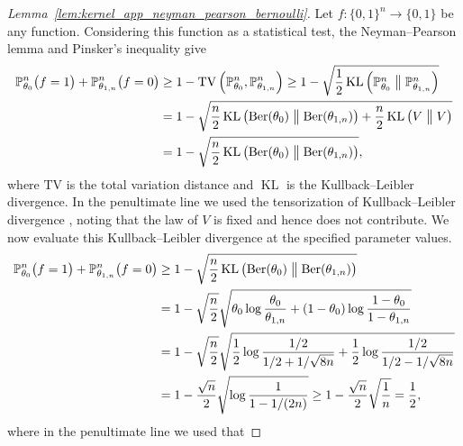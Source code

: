 \documentclass[11pt,lof]{puthesis}
\renewcommand{\P}{\ensuremath{\mathbb{P}}}
\newcommand{\TV}{\mathrm{TV}}
\DeclareMathOperator{\Ber}{Ber}
\DeclareMathOperator{\KL}{KL}
\theoremstyle{break}
\theoremstyle{proof}
\newtheorem{proof}{Proof}
\begin{document}
\begin{proof}[Lemma~\ref{lem:kernel_app_neyman_pearson_bernoulli}]

  Let $f: \{0,1\}^n \to \{0,1\}$
  be any function.
  Considering this function as a statistical test,
  the Neyman--Pearson lemma and Pinsker's inequality
  \citep{gine2021mathematical}
  give
  \begin{align*}
    \P_{\theta_0}^n \big(
      f=1
    \big)
    +\P_{\theta_{1,n}}^n \big(
      f=0
    \big)
    &\geq
    1-
    \TV\left(
      \P_{\theta_0}^n,
      \P_{\theta_{1,n}}^n
    \right)
    \geq
    1-
    \sqrt{
      \frac{1}{2}
      \KL \left(
        \P_{\theta_0}^n
        \bigm\|
        \P_{\theta_{1,n}}^n
    \right)} \\
    &=
    1-
    \sqrt{
      \frac{n}{2}
      \KL \left(
        \Ber(\theta_0)
        \bigm\|
        \Ber(\theta_{1,n})
      \right)
      + \frac{n}{2}
      \KL \left(
        V
        \bigm\|
        V
    \right)} \\
    &=
    1-
    \sqrt{
      \frac{n}{2}
      \KL \left(
        \Ber(\theta_0)
        \bigm\|
        \Ber(\theta_{1,n})
    \right)},
  \end{align*}
  where $\TV$ is the total variation distance
  and $\KL$ is the Kullback--Leibler divergence.
  In the penultimate line
  we used the tensorization of Kullback--Leibler divergence
  \citep{gine2021mathematical},
  noting that the law of $V$ is fixed and hence does not contribute.
  We now evaluate this Kullback--Leibler divergence at the specified
  parameter values.
  \begin{align*}
    \P_{\theta_0}^n \big(
      f=1
    \big)
    +\P_{\theta_{1,n}}^n \big(
      f=0
    \big)
    &\geq
    1-
    \sqrt{
      \frac{n}{2}
      \KL \left(
        \Ber(\theta_0)
        \bigm\|
        \Ber(\theta_{1,n})
    \right)} \\
    &=
    1-
    \sqrt{\frac{n}{2}}
    \sqrt{
      \theta_0 \log \frac{\theta_0}{\theta_{1,n}}
    + (1 - \theta_0) \log \frac{1 - \theta_0}{1 - \theta_{1,n}}} \\
    &=
    1-
    \sqrt{\frac{n}{2}}
    \sqrt{
      \frac{1}{2} \log \frac{1/2}{1/2 + 1/\sqrt{8n}}
    + \frac{1}{2} \log \frac{1/2}{1/2 - 1/\sqrt{8n}}} \\
    &=
    1-
    \frac{\sqrt n}{2}
    \sqrt{\log \frac{1}{1 - 1/(2n)}}
    \geq
    1-
    \frac{\sqrt n}{2}
    \sqrt{\frac{1}{n}}
    =
    \frac{1}{2},
  \end{align*}
  where in the penultimate line we used that

\end{proof}
\end{document}
